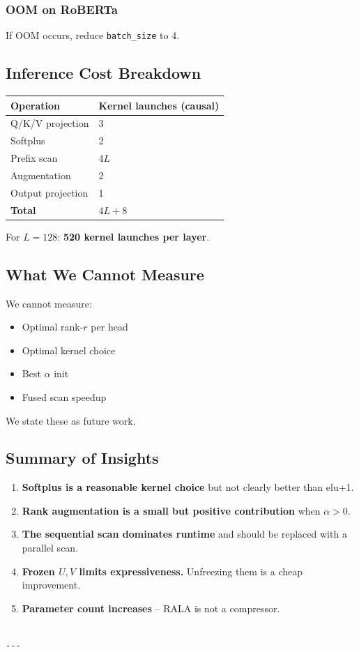 \subsubsection{OOM on RoBERTa}

If OOM occurs, reduce \texttt{batch\_size} to 4.

\subsection{Inference Cost Breakdown}

\begin{table}[H]
\centering
\small
\begin{tabular}{ll}
\toprule
\textbf{Operation} & \textbf{Kernel launches (causal)} \\
\midrule
Q/K/V projection & 3 \\
Softplus & 2 \\
Prefix scan & $4L$ \\
Augmentation & 2 \\
Output projection & 1 \\
\textbf{Total} & \textbf{$4L + 8$} \\
\bottomrule
\end{tabular}
\end{table}

For $L = 128$: \textbf{520 kernel launches per layer}.

\subsection{What We Cannot Measure}

We cannot measure:
\begin{itemize}
\item Optimal rank-$r$ per head
\item Optimal kernel choice
\item Best $\alpha$ init
\item Fused scan speedup

\end{itemize}
We state these as future work.

\subsection{Summary of Insights}

\begin{enumerate}
\item \textbf{Softplus is a reasonable kernel choice} but not clearly better than
  elu+1.
\item \textbf{Rank augmentation is a small but positive contribution} when
  $\alpha > 0$.
\item \textbf{The sequential scan dominates runtime} and should be replaced with a
  parallel scan.
\item \textbf{Frozen $U, V$ limits expressiveness.} Unfreezing them is a cheap
  improvement.
\item \textbf{Parameter count increases} -- RALA is not a compressor.
\end{enumerate}
\begin{lstlisting}

---
\end{lstlisting}